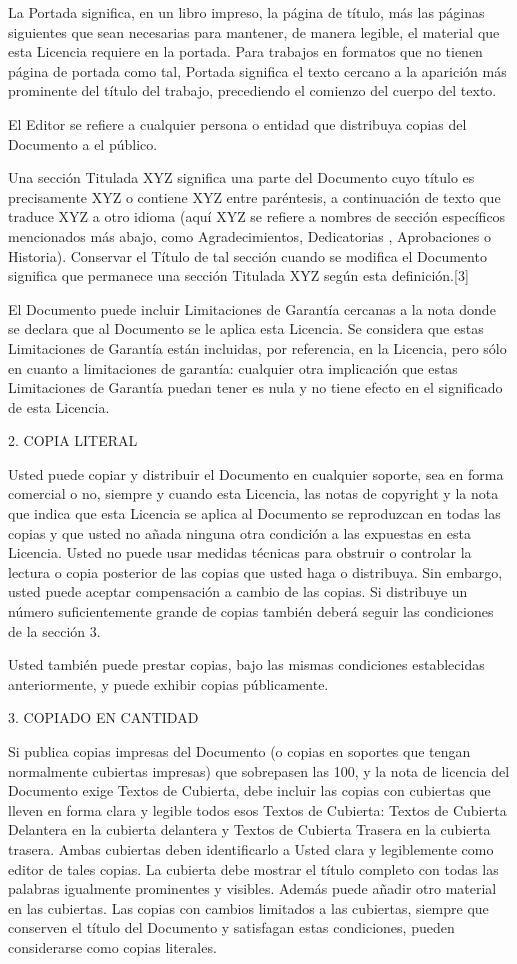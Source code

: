 \documentclass[a4paper, 11pt, oneside]{report}
\begin{document}
La Portada significa, en un libro impreso, la página de título, más las páginas siguientes que sean necesarias para mantener, de manera legible, el material que esta Licencia requiere en la portada. Para trabajos en formatos que no tienen página de portada como tal, Portada significa el texto cercano a la aparición más prominente del título del trabajo, precediendo el comienzo del cuerpo del texto.

El Editor se refiere a cualquier persona o entidad que distribuya copias del Documento a el público.

Una sección Titulada XYZ significa una parte del Documento cuyo título es precisamente XYZ o contiene XYZ entre paréntesis, a continuación de texto que traduce XYZ a otro idioma (aquí XYZ se refiere a nombres de sección específicos mencionados más abajo, como Agradecimientos, Dedicatorias , Aprobaciones o Historia). Conservar el Título de tal sección cuando se modifica el Documento significa que permanece una sección Titulada XYZ según esta definición.[3]

El Documento puede incluir Limitaciones de Garantía cercanas a la nota donde se declara que al Documento se le aplica esta Licencia. Se considera que estas Limitaciones de Garantía están incluidas, por referencia, en la Licencia, pero sólo en cuanto a limitaciones de garantía: cualquier otra implicación que estas Limitaciones de Garantía puedan tener es nula y no tiene efecto en el significado de esta Licencia.

2. COPIA LITERAL

Usted puede copiar y distribuir el Documento en cualquier soporte, sea en forma comercial o no, siempre y cuando esta Licencia, las notas de copyright y la nota que indica que esta Licencia se aplica al Documento se reproduzcan en todas las copias y que usted no añada ninguna otra condición a las expuestas en esta Licencia. Usted no puede usar medidas técnicas para obstruir o controlar la lectura o copia posterior de las copias que usted haga o distribuya. Sin embargo, usted puede aceptar compensación a cambio de las copias. Si distribuye un número suficientemente grande de copias también deberá seguir las condiciones de la sección 3.

Usted también puede prestar copias, bajo las mismas condiciones establecidas anteriormente, y puede exhibir copias públicamente.

3. COPIADO EN CANTIDAD

Si publica copias impresas del Documento (o copias en soportes que tengan normalmente cubiertas impresas) que sobrepasen las 100, y la nota de licencia del Documento exige Textos de Cubierta, debe incluir las copias con cubiertas que lleven en forma clara y legible todos esos Textos de Cubierta: Textos de Cubierta Delantera en la cubierta delantera y Textos de Cubierta Trasera en la cubierta trasera. Ambas cubiertas deben identificarlo a Usted clara y legiblemente como editor de tales copias. La cubierta debe mostrar el título completo con todas las palabras igualmente prominentes y visibles. Además puede añadir otro material en las cubiertas. Las copias con cambios limitados a las cubiertas, siempre que conserven el título del Documento y satisfagan estas condiciones, pueden considerarse como copias literales.
\end{document}
